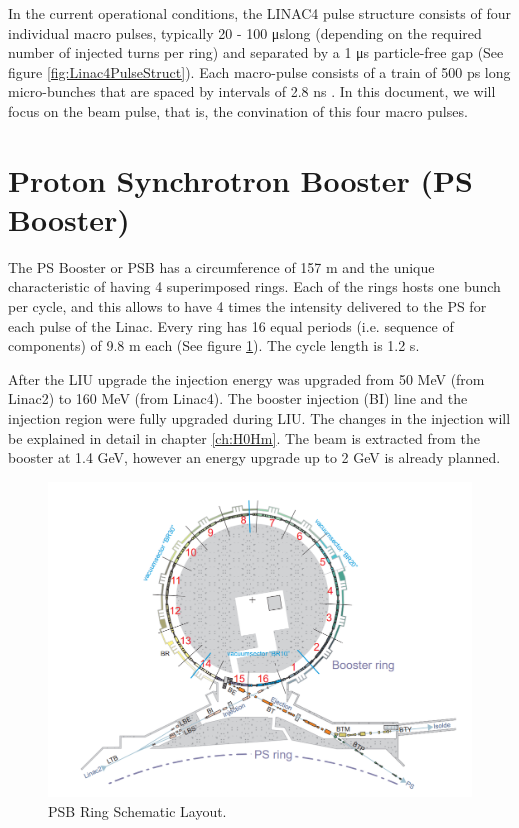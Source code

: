 In the current operational conditions, the LINAC4 pulse structure consists of four individual macro pulses, typically 20 - 100  \si[]{\micro \second}long (depending on the required number of injected turns per ring) and separated by a 1 \si[]{\micro \second} particle-free gap (See figure \ref{fig:Linac4PulseStruct}). Each macro-pulse consists of a train of 500 \si[]{\pico \second} long micro-bunches that are spaced by intervals of 2.8 \si[]{\nano \second} \parencite*[]{ref:Linac4PulseStruct}. In this document, we will focus on the beam pulse, that is, the convination of this four macro pulses.


\section{Proton Synchrotron Booster (PS Booster)}

The PS Booster or PSB has a circumference of 157 m and the unique characteristic of having 4 superimposed rings. Each of the rings hosts one bunch per cycle, and this allows to have 4 times the intensity delivered to the PS for each pulse of the Linac. Every ring has 16 equal periods (i.e. sequence of components) of 9.8 m each (See figure \ref{fig:PSB}).  The cycle length is 1.2 s. 

After the LIU upgrade the injection energy was upgraded from 50 MeV (from Linac2) to 160 MeV (from Linac4). The booster injection (BI) line and the injection region were fully upgraded during LIU. The changes in the injection will be explained in detail in chapter \ref{ch:H0Hm}. The beam is extracted from the booster at 1.4 GeV, however an energy upgrade up to 2 GeV is already planned. 

\begin{figure}[h]
    \centering
    \includegraphics[width=0.8\columnwidth]{Figure_BoosterRing/BoosterRing.png}
    \caption{PSB Ring Schematic Layout.}
    \label{fig:PSB}
\end{figure}



